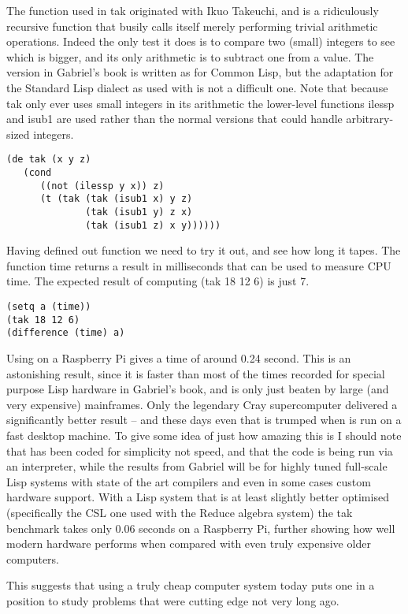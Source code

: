 The function used in {\tx tak} originated with Ikuo Takeuchi, and is a
ridiculously recursive function that busily calls itself merely performing
trivial arithmetic operations. Indeed the only test it does is to compare
two (small) integers to see which is bigger, and its only arithmetic is to
subtract one from a value. The version in Gabriel's book is written as for
Common Lisp, but the adaptation for the Standard Lisp dialect as used with
\vsl{} is not a difficult one. Note that because {\tx tak} only ever uses
small integers in its arithmetic the lower-level functions {\tx ilessp}
and {\tx isub1} are used rather than the normal versions that could
handle arbitrary-sized integers.
{\small\begin{verbatim}
(de tak (x y z)
   (cond
      ((not (ilessp y x)) z)
      (t (tak (tak (isub1 x) y z)
              (tak (isub1 y) z x)
              (tak (isub1 z) x y))))))
\end{verbatim}}

Having defined out function we need to try it out, and see how long it
tapes. The \vsl{} function {\tx time} returns a result in milliseconds
that can be used to measure CPU time. The expected result of computing
{\tx (tak 18 12 6)} is just 7.  
{\small\begin{verbatim}
(setq a (time))
(tak 18 12 6)
(difference (time) a)
\end{verbatim}}
Using \vsl{} on a Raspberry Pi
gives a time of around 0.24 second. 
This is an astonishing result, since it is
faster than most of the times recorded for special purpose Lisp
hardware in Gabriel's book, and is only just beaten by large (and very
expensive) mainframes. Only the legendary Cray supercomputer delivered
a significantly better result -- and these days even that is trumped
when \vsl{} is run on a fast desktop machine. To give some idea of just
how amazing this is I should note that \vsl{} has been coded for
simplicity not speed, and that the code is being run via an interpreter,
while the results from Gabriel will be for highly tuned full-scale
Lisp systems with state of the art compilers and even in some cases
custom hardware support. With a Lisp system that is at least slightly
better optimised (specifically the CSL one used with the Reduce algebra
system\cite{Reduce}) the {\tx tak} benchmark takes only 0.06 seconds on
a Raspberry Pi, further showing how well modern hardware performs
when compared with even truly expensive older computers.

This suggests that using a truly cheap computer system today puts one in
a position to study problems that were cutting edge not very long ago.


